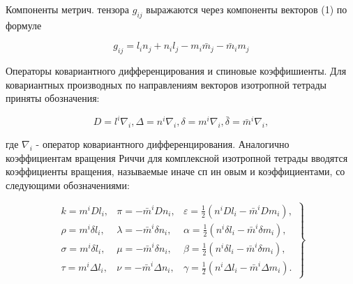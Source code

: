 \documentclass[10pt]{article}
\begin{document}
Компоненты метрич. тензора $g_{i j}$ выражаются через компоненты векторов (1) по формуле



\[

g_{i j}=l_{i} n_{j}+n_{i} l_{j}-m_{i} \bar{m}_{j}-\bar{m}_{i} m_{j}

\]



Операторы ковариантного дифференцирования и спиновые коэффишиенты. Для ковариантных производных по направлениям векторов изотропной тетрады приняты обозначения:



\[

D=l^{i} \nabla_{i}, \Delta=n^{i} \nabla_{i}, \delta=m^{i} \nabla_{i}, \bar{\delta}=\bar{m}^{i} \nabla_{i},

\]



где $\nabla_{i}$ - оператор ковариантного дифференцирования. Аналогично коэффициентам вращения Риччи для комплексной изотропной тетрады вводятся коэффициенты вращения, называемые иначе сп ин овым и коэффициентами, со следующими обозначениями:



\[

\left.\begin{array}{lll}

k=m^{i} D l_{i}, & \pi=-\bar{m}^{i} D n_{i}, & \varepsilon=\frac{1}{2}\left(n^{i} D l_{i}-\bar{m}^{i} D m_{i}\right), \\

\rho=m^{i} \delta l_{i}, & \lambda=-\bar{m}^{i} \delta n_{i}, & \alpha=\frac{1}{2}\left(n^{i} \delta l_{i}-\bar{m}^{i} \delta m_{i}\right), \\

\sigma=m^{i} \delta l_{i}, & \mu=-\bar{m}^{i} \delta n_{i}, & \beta=\frac{1}{2}\left(n^{i} \delta l_{i}-\bar{m}^{i} \delta m_{i}\right), \\

\tau=m^{i} \Delta l_{i}, & \nu=-\bar{m}^{i} \Delta n_{i}, & \gamma=\frac{1}{2}\left(n^{i} \Delta l_{i}-\bar{m}^{i} \Delta m_{i}\right) .

\end{array}\right\}

\]
\end{document}
